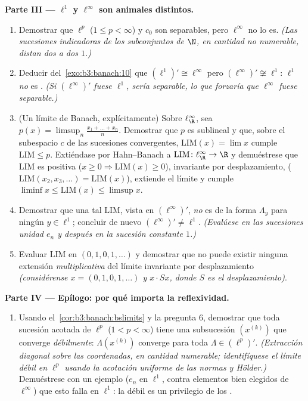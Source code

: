 \begin{problem}[{Problema de fin de semana --- $(\ell^p)' = \ell^q$,
reflexividad y la rareza de $\ell^\infty$}]
\medskip
\noindent\textbf{Parte III --- $\ell^1$ y $\ell^\infty$ son animales
distintos.}
\begin{enumerate}[resume]
  \item Demostrar que $\ell^p$ ($1 \leq p < \infty$) y $c_0$ son
  separables, pero $\ell^\infty$ no lo es. \emph{(Las sucesiones
  indicadoras de los subconjuntos de $\N$, en cantidad no numerable,
  distan dos a dos $1$.)} \item Deducir del~\cref{exo:b3:banach:10} que
  $(\ell^1)'
        \cong \ell^\infty$ pero $(\ell^\infty)' \not\cong
        \ell^1$: $\ell^1$ \emph{no} es
  . \emph{(Si $(\ell^\infty)'$
  fuese $\ell^1$, sería separable, lo que forzaría que $\ell^\infty$
  fuese separable.)} \item (Un límite de Banach, explícitamente) Sobre
  $\ell^\infty_\R$, sea $p(x) = \limsup_n \frac{x_1 + \dots + x_n}{n}$.
  Demostrar que $p$ es sublineal y que, sobre el subespacio $c$ de las
  sucesiones convergentes, $\mathrm{LIM}(x) = \lim x$ cumple
  $\mathrm{LIM} \leq p$. Extiéndase por Hahn--Banach a
  $\mathrm{LIM} \colon \ell^\infty_\R \to \R$ y demuéstrese que
  $\mathrm{LIM}$ es positiva ($x \geq 0 \Rightarrow
        \mathrm{LIM}(x) \geq 0$), invariante por desplazamiento,
        ($\mathrm{LIM}(x_2, x_3, \dots) = \mathrm{LIM}(x)$),
        extiende el límite y cumple $\liminf x \leq
        \mathrm{LIM}(x)\leq \limsup x$. \item Demostrar que una tal
        $\mathrm{LIM}$, vista en $(\ell^\infty)'$, \emph{no} es de la
        forma $\Lambda_y$ para ningún $y \in \ell^1$; concluir de nuevo
        $(\ell^\infty)'
        \neq \ell^1$. \emph{(Evalúese en las sucesiones unidad $e_n$ y
        después en la sucesión constante $1$.)} \item Evaluar
        $\mathrm{LIM}$ en $(0,1,0,1,\dots)$ y demostrar que no puede
        existir ninguna extensión \emph{multiplicativa} del límite
        invariante por desplazamiento \emph{(considérense $x =
        (0,1,0,1,\dots)$ y $x\cdot Sx$, donde $S$ es el
        desplazamiento)}.
\end{enumerate}

\medskip
\noindent\textbf{Parte IV --- Epílogo: por qué importa la reflexividad.}
\begin{enumerate}[resume]
  \item Usando el~\cref{cor:b3:banach:bslimits} y la pregunta 6,
  demostrar que toda sucesión acotada de $\ell^p$ ($1 < p <
        \infty$) tiene una subsucesión $(x^{(k)})$ que converge
  \emph{débilmente}: $\Lambda(x^{(k)})$ converge para toda
  $\Lambda \in (\ell^p)'$. \emph{(Extracción diagonal sobre las
  coordenadas, en cantidad numerable; identifíquese el límite débil en
  $\ell^p$ usando la acotación uniforme de las normas y Hölder.)}
  Demuéstrese con un ejemplo ($e_n$ en $\ell^1$, contra elementos bien
  elegidos de $\ell^\infty$) que esto falla en $\ell^1$: la 
  débil es un privilegio de los .
\end{enumerate}


\end{problem}
